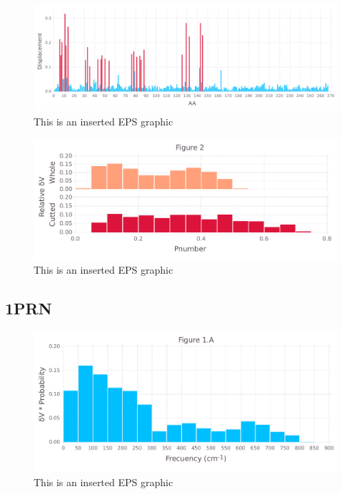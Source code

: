 \documentclass[10pt,letterpaper]{article}
\begin{document}
\begin{figure}[ht]
\begin{center}
\includegraphics[scale=0.5]{1m14/5figure.pdf}
\caption{This is an inserted EPS graphic}
\label{fig13}
\end{center}
\end{figure}

\begin{figure}[ht]
\begin{center}
\includegraphics[scale=0.5]{1m14/3both_figure.pdf}
\caption{This is an inserted EPS graphic}
\label{fig13}
\end{center}
\end{figure}

\FloatBarrier
\newpage

\subsection{1PRN}

\begin{figure}[ht]
\begin{center}
\includegraphics[scale=0.5]{1prn/1afigure.pdf}
\caption{This is an inserted EPS graphic}
\label{fig1}
\end{center}
\end{figure}
\end{document}
